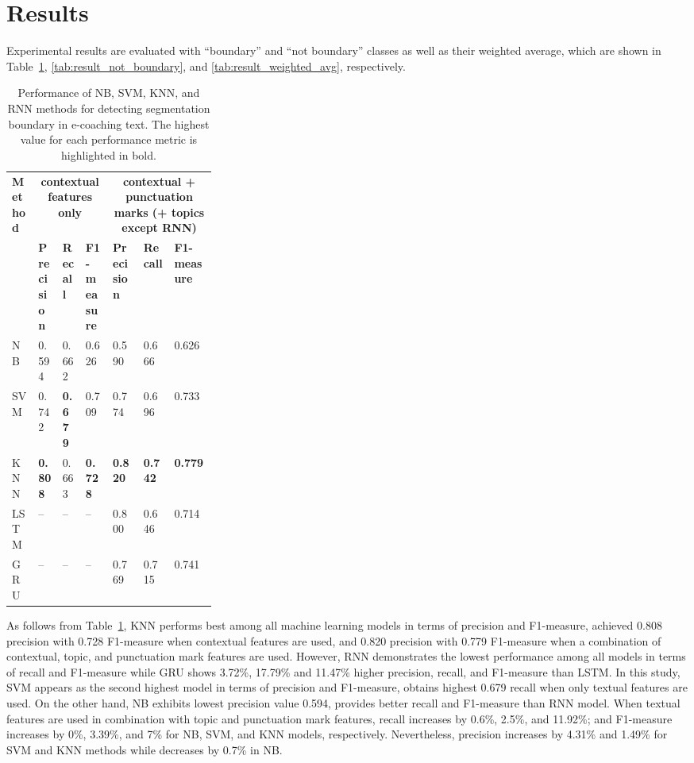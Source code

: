 \documentclass{amia}
\begin{document}
\section*{Results}
Experimental results are evaluated with ``boundary'' and ``not boundary'' classes as well as their weighted average, which are shown in Table~\ref{tab:result_boundary}, \ref{tab:result_not_boundary}, and \ref{tab:result_weighted_avg}, respectively.\\

\begin{table}[ht]
\centering
\caption{Performance of NB, SVM, KNN, and RNN methods for detecting segmentation boundary in e-coaching text. The highest value for each performance metric is highlighted in bold.}
\label{tab:result_boundary}
  \begin{tabular}{|l|l|l|l|p{0.15\linewidth}|p{0.15\linewidth}|l|}
  \hline
   \multirow{2}{*}{\textbf{Method}} & \multicolumn{3}{|c|}{\textbf{contextual features only}} & \multicolumn{3}{|c|}{\textbf{contextual + punctuation marks (+ topics except RNN)}} \\\cline{2-7}
   & \textbf{Precision}  & \textbf{Recall} & \textbf{F1-measure} & \textbf{Precision}  & \textbf{Recall} & \textbf{F1-measure}\\ \hline    
    
 NB & 0.594 & 0.662 & 0.626 & 0.590 & 0.666 & 0.626 \\ \hline
 SVM & 0.742 & \textbf{0.679} & 0.709 & 0.774 & 0.696 & 0.733\\ \hline
 KNN & \textbf{0.808} & 0.663 & \textbf{0.728} & \textbf{0.820} & \textbf{0.742} & \textbf{0.779}\\ \hline
 LSTM & -- & -- & -- & 0.800 & 0.646 & 0.714  \\ \hline
 GRU & -- & -- & -- & 0.769 & 0.715 & 0.741 \\ \hline 
  \end{tabular}
\end{table}                 

As follows from Table~\ref{tab:result_boundary}, KNN performs best among all machine learning models in terms of precision and F1-measure, achieved 0.808 precision with 0.728 F1-measure when contextual features are used, and 0.820 precision with 0.779 F1-measure when a combination of contextual, topic, and punctuation mark features are used. However, RNN demonstrates the lowest performance among all models in terms of recall and F1-measure while GRU shows 3.72\%, 17.79\% and 11.47\% higher precision, recall, and F1-measure than LSTM. In this study, SVM appears as the second highest model in terms of precision and F1-measure, obtains highest 0.679 recall when only textual features are used. On the other hand, NB exhibits lowest precision value 0.594, provides better recall and F1-measure than RNN model. When textual features are used in combination with topic and punctuation mark features, recall increases by 0.6\%, 2.5\%, and 11.92\%; and F1-measure increases by 0\%, 3.39\%, and 7\% for NB, SVM, and KNN models, respectively. Nevertheless, precision increases by 4.31\% and 1.49\% for SVM and KNN methods while decreases by 0.7\% in NB. \\
\end{document}
